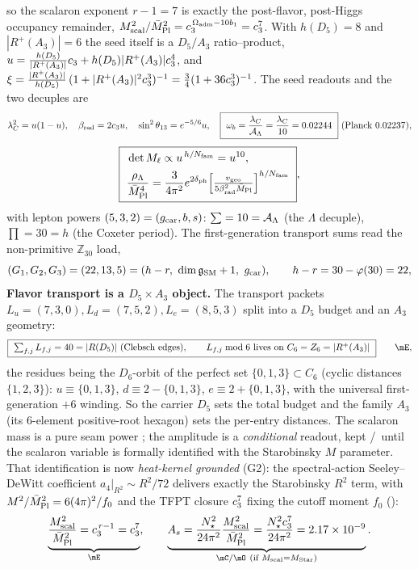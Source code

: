 so the scalaron exponent $r-1=7$ is exactly the post-flavor, post-Higgs occupancy remainder,
$M_{\mathrm{scal}}^2/\bar M_{\mathrm{Pl}}^2=c_3^{\,\Omega_{\mathrm{adm}}-10b_1}=c_3^7$. With $h(D_5)=8$ and $|R^+(A_3)|=6$
the seed itself is a $D_5/A_3$ ratio--product, $u=\tfrac{h(D_5)}{|R^+(A_3)|}c_3+h(D_5)|R^+(A_3)|c_3^4$,
and $\xi=\tfrac{|R^+(A_3)|}{h(D_5)}\,(1+|R^+(A_3)|^2c_3^3)^{-1}=\tfrac34(1+36c_3^3)^{-1}$.
The seed readouts and the two decuples are
\begin{equation}
  \lC^2=\useed(1-\useed),\quad \betarad=2\cthree\useed,\quad \sin^2\theta_{13}=e^{-5/6}\useed,\quad
  \boxed{\ \omega_b=\frac{\lC}{\AL}=\frac{\lC}{10}=0.02244\ }\ (\text{Planck }0.02237),
\end{equation}
\begin{equation}
  \boxed{\ \begin{aligned}
    &\det M_\ell\propto\useed^{\,h/\Nfam}=\useed^{10},\\
    &\frac{\rho_\Lambda}{\Mbar^4}=\frac{3}{4\pi^2}e^{2\dph}\Bigl[\tfrac{v_{\mathrm{geo}}}{5\betarad^2\Mbar}\Bigr]^{h/\Nfam}
  \end{aligned}\ },
\end{equation}
with lepton powers $(5,3,2)=(g_{\mathrm{car}},b,s)$: $\sum=10=\mathcal A_\Lambda$ (the $\Lambda$ decuple), $\prod=30=h$ (the
Coxeter period). The first-generation transport sums read the non-primitive $\mathbb Z_{30}$ load,
\begin{equation}
  (G_1,G_2,G_3)=(22,13,5)=(h-r,\ \dimg+1,\ \gcar),\qquad h-r=30-\varphi(30)=22 ,
\end{equation}
\textbf{Flavor transport is a $D_5\times A_3$ object.} The transport packets
$L_u{=}(7,3,0),L_d{=}(7,5,2),L_e{=}(8,5,3)$ split into a $D_5$ budget and an $A_3$ geometry:
\begin{equation}
  \boxed{\ \textstyle\sum_{f,j}L_{f,j}=40=|R(D_5)|\ (\text{Clebsch edges}),\qquad
  L_{f,j}\bmod 6\ \text{lives on}\ C_6=Z_6=|R^+(A_3)|\ }\qquad\mE ,
\end{equation}
the residues being the $D_6$-orbit of the perfect set $\{0,1,3\}\subset C_6$ (cyclic distances
$\{1,2,3\}$): $u\!\equiv\!\{0,1,3\}$, $d\!\equiv\!2{-}\{0,1,3\}$, $e\!\equiv\!2{+}\{0,1,3\}$, with the
universal first-generation $+6$ winding. So the carrier $D_5$ sets the total budget and the family
$A_3$ (its $6$-element positive-root hexagon) sets the per-entry distances.
The scalaron mass is a pure seam power \mE; the amplitude is a \emph{conditional} readout, kept
\mC/\mO\ until the scalaron variable is formally identified with the Starobinsky $M$ parameter. That
identification is now \emph{heat-kernel grounded} (G2): the spectral-action Seeley--DeWitt coefficient
$a_4|_{R^2}\!\sim\!R^2/72$ delivers exactly the Starobinsky $R^2$ term, with $M^2/\bar M_{\mathrm{Pl}}^2=6(4\pi)^2/f_0$ and
the TFPT closure $c_3^7$ fixing the cutoff moment $f_0$ ():
\begin{equation}
  \underbrace{\frac{M_{\mathrm{scal}}^2}{\Mbar^2}=\cthree^{\,r-1}=\cthree^7}_{\mE},\qquad
  \underbrace{A_s=\frac{N_\star^2}{24\pi^2}\frac{M_{\mathrm{scal}}^2}{\Mbar^2}=\frac{N_\star^2\cthree^7}{24\pi^2}=2.17\times10^{-9}}_{\mC/\mO\ (\text{if }M_{\mathrm{scal}}=M_{\mathrm{Star}})} .
\end{equation}


